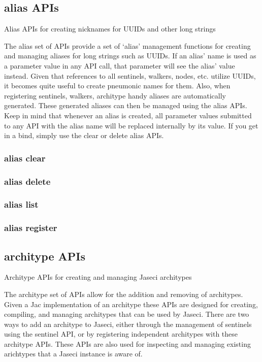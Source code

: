 \subsection{alias APIs}

Alias APIs for creating nicknames for UUIDs and other long strings
\par
The alias set of APIs provide a set of `alias' management functions for
creating and managing aliases for long strings such as UUIDs. If an alias'
name is used as a parameter value in any API call, that parameter will see
the alias' value instead. Given that references to all sentinels, walkers,
nodes, etc. utilize UUIDs, it becomes quite useful to create pneumonic
names for them. Also, when registering   sentinels, walkers, architype
handy aliases are automatically generated. These generated aliases can
then be managed using the alias APIs. Keep in mind that whenever an alias
is created, all parameter values submitted to any API with the alias name
will be replaced internally by its value. If you get in a bind, simply use
the clear or delete alias APIs.

\subsubsection{alias clear}

\subsubsection{alias delete}

\subsubsection{alias list}

\subsubsection{alias register}

\subsection{architype APIs}

Architype APIs for creating and managing Jaseci architypes
\par
The architype set of APIs allow for the addition and removing of
architypes. Given a Jac implementation of an architype these APIs are
designed for creating, compiling, and managing architypes that can be
used by Jaseci. There are two ways to add an architype to Jaseci, either
through the management of sentinels using the sentinel API, or by
registering independent architypes with these architype APIs. These
APIs are also used for inspecting and managing existing arichtypes that
a Jaseci instance is aware of.

